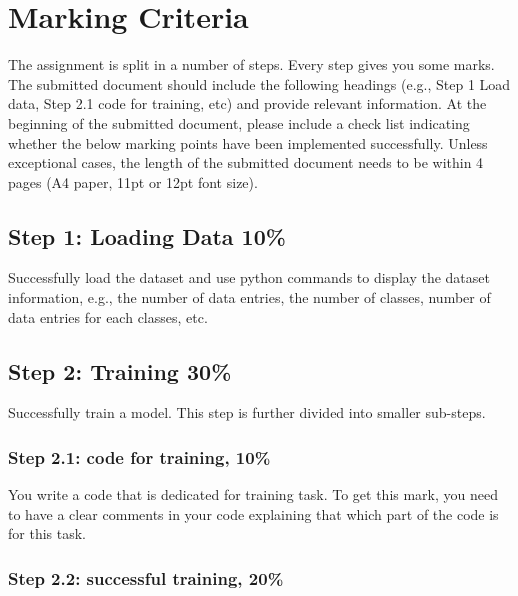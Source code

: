 \documentclass[12pt,a4]{article}
\begin{document}
\section{Marking Criteria}\label{sec:marking}
The assignment is split in a number of steps. 
Every step gives you some marks. The submitted document should include the following headings (e.g., Step 1 Load data, Step 2.1 code for training, etc) and provide relevant information. 
At the beginning of the submitted document, please include a check list indicating whether the below marking points have been implemented successfully.
Unless exceptional cases, the length of the submitted document needs to be within 4 pages (A4 paper, 11pt or 12pt font size). 
%


\subsection*{Step 1: Loading Data 10\%}

Successfully load the dataset and use python commands to display the dataset information, e.g., the number of data entries, the number of classes, number of data entries for each classes, etc. 



\subsection*{Step 2: Training 30\%} 

Successfully train a model. This step is further divided into smaller sub-steps. 

\subsubsection*{Step 2.1: code for training, 10\%}

You write a code that is dedicated for training task. To get this mark, you need to have a clear comments in your code explaining that which part of the code is for this task. 

\subsubsection*{Step 2.2: successful training, 20\%}
\end{document}
